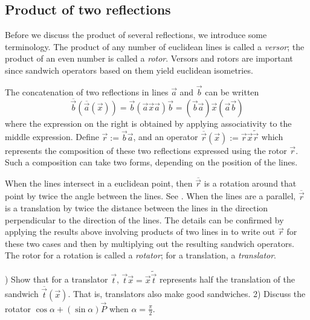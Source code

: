 \documentclass[12pt]{article}
\newcommand{\mydogblue}{{\color{gray} $\square$~~}}
\begin{document}
{\subsection{Product of two reflections}
\label{sec:prtworef}
Before we discuss the product of several  reflections,  we introduce some terminology. The product of any number of euclidean lines is called a \emph{versor};  the product of an even number is called a \emph{rotor}.  Versors and rotors are important since sandwich operators based on them yield euclidean isometries.

The concatenation of two reflections  in lines $\vec{a}$ and $\vec{b}$ can be written \[\overline{\vec{b}}(\overline{\vec{a}}(\vec{x})) = \vec{b}(\vec{a}\vec{x}\vec{a})\vec{b} = (\vec{b}\vec{a})\vec{x}(\vec{a}\vec{b})\]  where the expression on the right is obtained by applying associativity to the middle expression.  Define  $\vec{r} := \vec{b}\vec{a}$, and an operator $\overline{\vec{r}}(\vec{x}):= \vec{r} \vec{x}\widetilde{\vec{r}}$ which represents the composition of these two reflections expressed using the rotor  $\vec{r}$. Such a composition can take two forms, depending on the position of the lines.  

When the lines intersect in a euclidean point, then $\overline{\vec{r}}$  is a rotation around that point by twice the angle between the lines.  See .  When the lines are a parallel, $\overline{\vec{r}}$ is a translation by twice the distance between the lines in the direction perpendicular to the direction of the lines.  The details can be confirmed by applying the results above involving products of two lines  in  to write out $\vec{r}$ for these two cases and then by multiplying out the resulting sandwich operators.  The rotor for a rotation is called a \emph{rotator}; for a translation, a \emph{translator}. 


) Show that for a translator $\vec{t}$, $\vec{t}\vec{x} = \vec{x}\widetilde{\vec{t}}$ represents half the translation of the sandwich $\overline{\vec{t}}(\vec{x})$. That is, translators also make good  sandwiches. 2) Discuss the rotator $\cos{\alpha} + (\sin{\alpha})\vec{P}$ when $\alpha = \frac{\pi}{2}$. %

}
\end{document}
